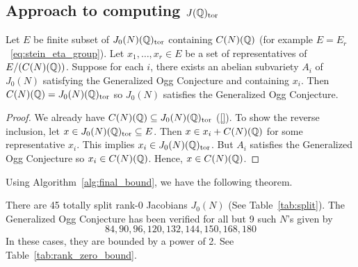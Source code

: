 \subsection{Approach to computing $J(\mathbb{Q})_{\mathrm{tor}}$}%
\label{sub:approach_to_computing_j_qq__tor_}

\begin{proposition}
    Let $E$ be finite subset of $J_0(N)(\mathbb{Q})_{\mathrm{tor}}$ containing $C(N)(\mathbb{Q})$ (for
    example $E=E_r$~\eqref{eq:stein_eta_group}). Let $x_1,\ldots,x_r\in E$ be a
    set of representatives of $E/(C(N)(\mathbb{Q}))$. Suppose for each $i$, there
    exists an abelian subvariety $A_i$ of $J_0(N)$ satisfying the Generalized
    Ogg Conjecture and containing $x_i$. Then $C(N)(\mathbb{Q})=J_0(N)(\mathbb{Q})_{\mathrm{tor}}$ so
    $J_0(N)$ satisfies the Generalized Ogg Conjecture.
\end{proposition}
\begin{proof}
    We already have $C(N)(\mathbb{Q})\subseteq J_0(N)(\mathbb{Q})_{\mathrm{tor}}$ (\ref{}). To show the
    reverse inclusion, let $x\in J_0(N)(\mathbb{Q})_{\mathrm{tor}}\subseteq E$. Then $x\in
    x_i+C(N)(\mathbb{Q})$ for some representative $x_i$. This implies $x_i\in
    J_0(N)(\mathbb{Q})_{\mathrm{tor}}$. But $A_i$ satisfies the Generalized Ogg Conjecture so
    $x_i\in C(N)(\mathbb{Q})$. Hence, $x\in C(N)(\mathbb{Q})$.
\end{proof}

Using Algorithm~\ref{alg:final_bound}, we have the following theorem.
\begin{theorem}%
    \label{thm:verification_rank_zero}
    There are 45 totally split rank-0 Jacobians $J_0(N)$ (See
    Table~\ref{tab:split}). The Generalized Ogg Conjecture has been verified
    for all but 9 such $N$'s given by
    \[
        84,90,96,120,132,144,150,168,180
    \]
    In these cases, they are bounded by a power of 2. See
    Table~\ref{tab:rank_zero_bound}.
\end{theorem}

